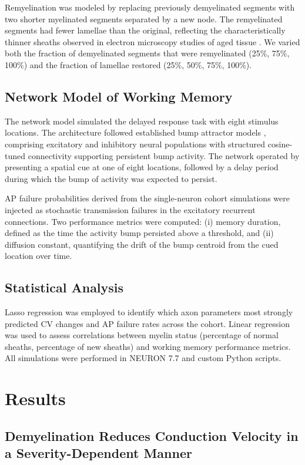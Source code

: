 \documentclass[11pt]{article}
\begin{document}
Remyelination was modeled by replacing previously demyelinated segments with two shorter myelinated segments separated by a new node. The remyelinated segments had fewer lamellae than the original, reflecting the characteristically thinner sheaths observed in electron microscopy studies of aged tissue \citep{peters2009}. We varied both the fraction of demyelinated segments that were remyelinated (25\%, 75\%, 100\%) and the fraction of lamellae restored (25\%, 50\%, 75\%, 100\%).

\subsection{Network Model of Working Memory}

The network model simulated the delayed response task with eight stimulus locations. The architecture followed established bump attractor models \citep{compte2000}, comprising excitatory and inhibitory neural populations with structured cosine-tuned connectivity supporting persistent bump activity. The network operated by presenting a spatial cue at one of eight locations, followed by a delay period during which the bump of activity was expected to persist.

AP failure probabilities derived from the single-neuron cohort simulations were injected as stochastic transmission failures in the excitatory recurrent connections. Two performance metrics were computed: (i) memory duration, defined as the time the activity bump persisted above a threshold, and (ii) diffusion constant, quantifying the drift of the bump centroid from the cued location over time.

\subsection{Statistical Analysis}

Lasso regression was employed to identify which axon parameters most strongly predicted CV changes and AP failure rates across the cohort. Linear regression was used to assess correlations between myelin status (percentage of normal sheaths, percentage of new sheaths) and working memory performance metrics. All simulations were performed in NEURON 7.7 and custom Python scripts.

\section{Results}

\subsection{Demyelination Reduces Conduction Velocity in a Severity-Dependent Manner}
\end{document}
